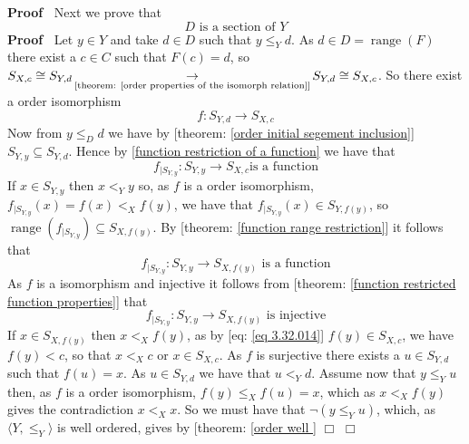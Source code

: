 \documentclass{book}
\newcommand{\Rightarrowlim}{\mathop{\rightarrow}\limits}
\newcommand{\tmop}[1]{\ensuremath{\operatorname{#1}}}
\newenvironment{proof}{\noindent\textbf{Proof\ }}{\hspace*{\fill}$\Box$\medskip}
\begin{document}
\begin{proof}
  Next we prove that
  \begin{equation}
    \label{eq 3.31.014} D \text{ is a section of } Y
  \end{equation}
  \begin{proof}
    Let $y \in Y$ and take $d \in D$ such that $y \leqslant_Y d$. As $d \in D
    = \tmop{range} (F)$ there exist a $c \in C$ such that $F (c) = d$, so
    $S_{X, c} \cong S_{Y, d} \Rightarrowlim_{\text{[theorem: \ref{order
    properties of the isomorph relation}]}} S_{Y, d} \cong S_{X, c}$. So there
    exist a order isomorphism
    \begin{equation}
      \label{eq 3.32.014} f : S_{Y, d} \rightarrow S_{X, c}
    \end{equation}
    Now from $y \leqslant_D d$ we have by [theorem: \ref{order initial
    segement inclusion}] $S_{Y, y} \subseteq S_{Y, d}$. Hence by \ref{function
    restriction of a function} we have that
    \begin{equation}
      \label{eq 3.33.014} f_{|S_{Y, y}} : S_{Y, y} \rightarrow S_{X, c} \text{
      is a function}
    \end{equation}
    If $x \in S_{Y, y}$ then $x <_Y y$ so, as $f$ is a order isomorphism,
    $f_{|S_{Y, y}} (x) = f (x) <_X f (y)$, we have that $f_{|S_{Y, y}} (x) \in
    S_{Y, f (y)}$, so $\tmop{range} (f_{|S_{Y, y}}) \subseteq S_{X, f (y)}$.
    By [theorem: \ref{function range restriction}] it follows that
    \begin{equation}
      \label{eq 3.34.014} f_{|S_{Y, y}} : S_{Y, y} \rightarrow S_{X, f (y)}
      \text{ is a function}
    \end{equation}
    As $f$ is a isomorphism and injective it follows from [theorem:
    \ref{function restricted function properties}] that
    \begin{equation}
      \label{eq 3.35.014} f_{|S_{Y, y}} : S_{Y, y} \rightarrow S_{X, f (y)}
      \text{ is injective} 
    \end{equation}
    If $x \in S_{X, f (y)}$ then $x <_X f (y)$, as by [eq: \ref{eq 3.32.014}]
    $f (y) \in S_{X, c}$, we have $f (y) < c$, so that $x <_X c$ or $x \in
    S_{X, c}$. As $f$ is surjective there exists a $u \in S_{Y, d}$ such that
    $f (u) = x$. As $u \in S_{Y, d}$ we have that $u <_Y d$. Assume now that
    $y \leqslant_Y u$ then, as $f$ is a order isomorphism, $f (y) \leqslant_X
    f (u) = x$, which as $x <_X f (y)$ gives the contradiction $x <_X x$. So
    we must have that $\neg (y \leqslant_Y u)$, which, as $\langle Y,
    \leqslant_Y \rangle$ is well ordered, gives by [theorem: \ref{order well
}
\end{proof}
\end{proof}
\end{document}

